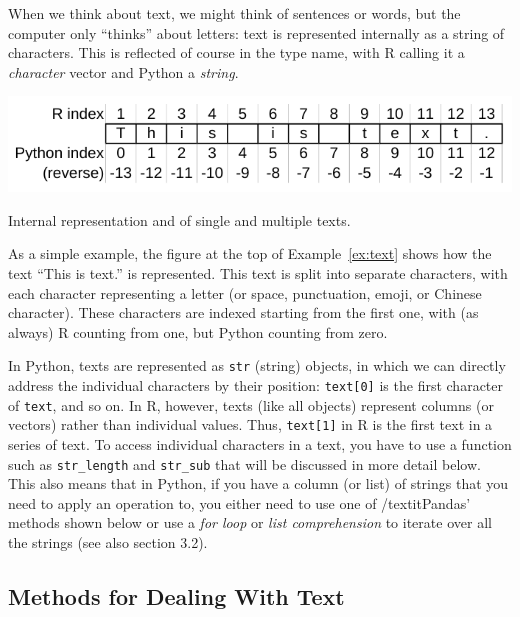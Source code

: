 When we think about text, we might think of sentences or words, but the computer only ``thinks'' about letters:
text is represented internally as a string of characters.
This is reflected of course in the type name, with R calling it a \emph{character} vector and Python a \emph{string}.

\begin{ccsexample}
  \begin{center} \includegraphics[width=.6\textwidth]{chapter09/text.pdf}\end{center}


  \caption{Internal representation and of single and multiple texts.}\label{ex:text}
\end{ccsexample}

As a simple example, the figure at the top of Example~\ref{ex:text} shows how the text ``This is text.'' is represented.
This text is split into separate characters, with each character representing a letter (or space,  punctuation, emoji, or Chinese character).
These characters are indexed starting from the first one, with (as always) R counting from one, but Python counting from zero.

In Python, texts are represented as \texttt{str} (string) objects, in which we can directly address the individual characters by their position:
\verb|text[0]| is the first character of \verb|text|, and so on.
In R, however, texts (like all objects) represent columns (or vectors) rather than individual values.
Thus, \verb|text[1]| in R is the first text in a series of text.
To access individual characters in a text, you have to use a function such as \texttt{str\_length} and \texttt{str\_sub} that will be discussed in more detail below.
This also means that in Python, if you have a column (or list) of strings that you need to apply an operation to,
you either need to use one of /textit{Pandas}' methods shown below or use a \emph{for loop} or \emph{list comprehension} to iterate over all the strings (see also section 3.2).

\subsection{Methods for Dealing With Text}\label{sec:textmethods}

